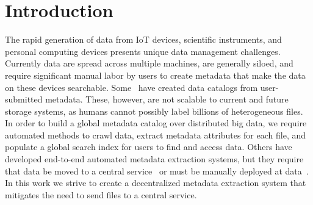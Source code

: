 \documentclass[sigconf, 9pt]{acmart}
\begin{document}


\maketitle


\section{Introduction}

The rapid generation of data from IoT devices, scientific instruments, and personal computing devices presents unique 
data management challenges. Currently data are spread across multiple machines, are generally siloed, and require 
significant manual labor by users to create metadata that make the data on these devices searchable. Some~\cite{egan2003vizier, welter2013nhgri, irods, dataverse}  have created data catalogs from user-submitted metadata. These, however, are not scalable to current and future storage systems,
as humans cannot possibly label billions of heterogeneous files. 
In order to build a global metadata catalog over distributed big data, we require automated methods to crawl data, extract 
metadata attributes for each file, and populate a global search index for users to find and access data. Others have developed end-to-end 
automated metadata extraction systems, but they require that data be moved to a central service~\cite{skluzacek2018skluma, skluzacek2016klimatic, padhy2015brown, rodrigo2018sciencesearch} or must be manually deployed at data~\cite{mattmann2011tika}. 
In this work we strive to create a decentralized metadata extraction system that mitigates the need to send files to a central service.  

\end{document}
